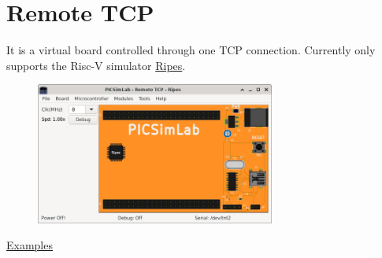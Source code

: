 \section{Remote TCP}

It is a virtual board controlled through one TCP connection. 
Currently only supports the Risc-V simulator \href{https://github.com/mortbopet/Ripes}{Ripes}.

\begin{figure}[H]
\center
\includegraphics[width=0.7\textwidth]{img/RemoteTCP.png} 
\end{figure} 

\href{https://lcgamboa.github.io/picsimlab_examples/board_Remote_TCP.html}{Examples}


